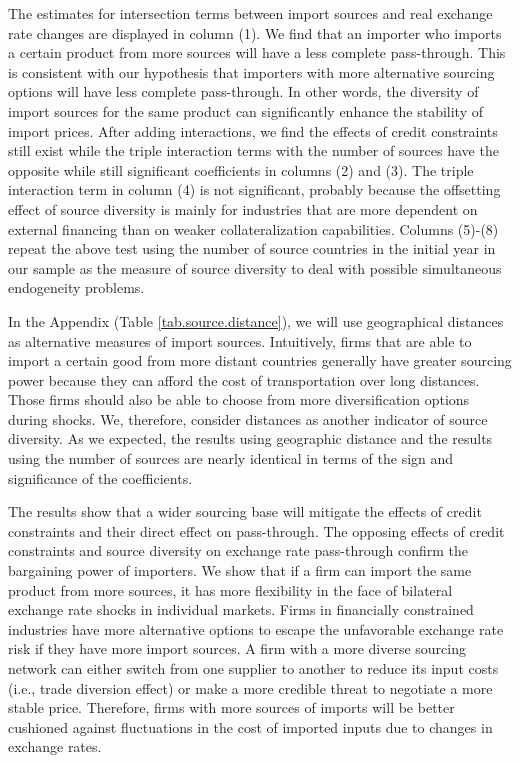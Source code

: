 \documentclass[12pt]{article}
\begin{document}
The estimates for intersection terms between import sources and real exchange rate changes are displayed in column (1). We find that an importer who imports a certain product from more sources will have a less complete pass-through. This is consistent with our hypothesis that importers with more alternative sourcing options will have less complete pass-through. In other words, the diversity of import sources for the same product can significantly enhance the stability of import prices. After adding interactions, we find the effects of credit constraints still exist while the triple interaction terms with the number of sources have the opposite while still significant coefficients in columns (2) and (3). The triple interaction term in column (4) is not significant, probably because the offsetting effect of source diversity is mainly for industries that are more dependent on external financing than on weaker collateralization capabilities. Columns (5)-(8) repeat the above test using the number of source countries in the initial year in our sample as the measure of source diversity to deal with possible simultaneous endogeneity problems. 

In the Appendix (Table \ref{tab.source.distance}), we will use geographical distances  as alternative measures of import sources. Intuitively, firms that are able to import a certain good from more distant countries generally have greater sourcing power because they can afford the cost of transportation over long distances. Those firms should also be able to choose from more diversification options during shocks. We, therefore, consider distances as another indicator of source diversity. As we expected, the results using geographic distance and the results using the number of sources are nearly identical in terms of the sign and significance of the coefficients.

The results show that a wider sourcing base will mitigate the effects of credit constraints and their direct effect on pass-through. The opposing effects of credit constraints and source diversity on exchange rate pass-through confirm the bargaining power of importers. We show that if a firm can import the same product from more sources, it has more flexibility in the face of bilateral exchange rate shocks in individual markets. Firms in financially constrained industries have more alternative options to escape the unfavorable exchange rate risk if they have more import sources. A firm with a more diverse sourcing network can either switch from one supplier to another to reduce its input costs (i.e., trade diversion effect) or make a more credible threat to negotiate a more stable price. Therefore, firms with more sources of imports will be better cushioned against fluctuations in the cost of imported inputs due to changes in exchange rates.
\end{document}
